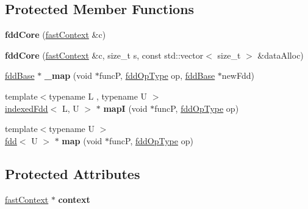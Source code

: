 \subsection*{Protected Member Functions}
\begin{DoxyCompactItemize}
\item 
\hypertarget{classfaster_1_1fddCore_af2bf966f3d75e2d7d0d81f120fb7599a}{}\label{classfaster_1_1fddCore_af2bf966f3d75e2d7d0d81f120fb7599a} 
{\bfseries fdd\+Core} (\hyperlink{classfaster_1_1fastContext}{fast\+Context} \&c)
\item 
\hypertarget{classfaster_1_1fddCore_a437156da84fb4f0e7cb58f2f67ff172b}{}\label{classfaster_1_1fddCore_a437156da84fb4f0e7cb58f2f67ff172b} 
{\bfseries fdd\+Core} (\hyperlink{classfaster_1_1fastContext}{fast\+Context} \&c, size\+\_\+t s, const std\+::vector$<$ size\+\_\+t $>$ \&data\+Alloc)
\item 
\hypertarget{classfaster_1_1fddCore_a1fff34f140b7634b1a6e60b8069a3a29}{}\label{classfaster_1_1fddCore_a1fff34f140b7634b1a6e60b8069a3a29} 
\hyperlink{classfaster_1_1fddBase}{fdd\+Base} $\ast$ {\bfseries \+\_\+map} (void $\ast$funcP, \hyperlink{namespacefaster_a64379512d12d41c6e58f176939abfd80}{fdd\+Op\+Type} op, \hyperlink{classfaster_1_1fddBase}{fdd\+Base} $\ast$new\+Fdd)
\item 
\hypertarget{classfaster_1_1fddCore_a87e8b9e76ef7138a1394265528944ffe}{}\label{classfaster_1_1fddCore_a87e8b9e76ef7138a1394265528944ffe} 
{\footnotesize template$<$typename L , typename U $>$ }\\\hyperlink{classfaster_1_1indexedFdd}{indexed\+Fdd}$<$ L, U $>$ $\ast$ {\bfseries mapI} (void $\ast$funcP, \hyperlink{namespacefaster_a64379512d12d41c6e58f176939abfd80}{fdd\+Op\+Type} op)
\item 
\hypertarget{classfaster_1_1fddCore_a30e174ccee6fc2d00387c85161422825}{}\label{classfaster_1_1fddCore_a30e174ccee6fc2d00387c85161422825} 
{\footnotesize template$<$typename U $>$ }\\\hyperlink{classfaster_1_1fdd}{fdd}$<$ U $>$ $\ast$ {\bfseries map} (void $\ast$funcP, \hyperlink{namespacefaster_a64379512d12d41c6e58f176939abfd80}{fdd\+Op\+Type} op)
\end{DoxyCompactItemize}
\subsection*{Protected Attributes}
\begin{DoxyCompactItemize}
\item 
\hypertarget{classfaster_1_1fddCore_aa2bf63bd5c77afe78061ed4df3713a76}{}\label{classfaster_1_1fddCore_aa2bf63bd5c77afe78061ed4df3713a76} 
\hyperlink{classfaster_1_1fastContext}{fast\+Context} $\ast$ {\bfseries context}
\end{DoxyCompactItemize}



